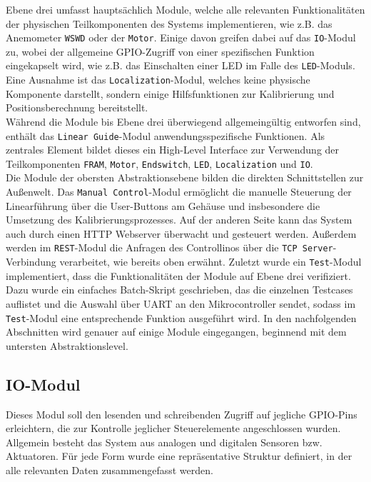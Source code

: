 \noindent
Ebene drei umfasst hauptsächlich Module, welche alle relevanten Funktionalitäten der physischen Teilkomponenten des Systems implementieren, wie z.B. das Anemometer \verb|WSWD| oder der \verb|Motor|. Einige davon greifen dabei auf das \verb|IO|-Modul zu, wobei der allgemeine GPIO-Zugriff von einer spezifischen Funktion eingekapselt wird, wie z.B. das Einschalten einer LED im Falle des \verb|LED|-Moduls. Eine Ausnahme ist das \verb|Localization|-Modul, welches keine physische Komponente darstellt, sondern einige Hilfsfunktionen zur Kalibrierung und Positionsberechnung bereitstellt.\\

\noindent
Während die Module bis Ebene drei überwiegend allgemeingültig entworfen sind, enthält das \verb|Linear Guide|-Modul anwendungsspezifische Funktionen. Als zentrales Element bildet dieses ein High-Level Interface zur Verwendung der Teilkomponenten \verb|FRAM|, \verb|Motor|, \verb|Endswitch|, \verb|LED|, \verb|Localization| und \verb|IO|. \\

\noindent
Die Module der obersten Abstraktionsebene bilden die direkten Schnittstellen zur Außenwelt. Das \verb|Manual Control|-Modul ermöglicht die manuelle Steuerung der Linearführung über die User-Buttons am Gehäuse und insbesondere die Umsetzung des Kalibrierungsprozesses. Auf der anderen Seite kann das System auch durch einen \ac{HTTP} Webserver überwacht und gesteuert werden. Außerdem werden im \verb|REST|-Modul die Anfragen des Controllinos über die \verb|TCP Server|-Verbindung verarbeitet, wie bereits oben erwähnt. Zuletzt wurde ein \verb|Test|-Modul implementiert, dass die Funktionalitäten der Module auf Ebene drei verifiziert. Dazu wurde ein einfaches Batch-Skript geschrieben, das die einzelnen Testcases auflistet und die Auswahl über UART an den  Mikrocontroller sendet, sodass im \verb|Test|-Modul eine entsprechende Funktion ausgeführt wird. In den nachfolgenden Abschnitten wird genauer auf einige Module eingegangen, beginnend mit dem untersten Abstraktionslevel.

\subsection{IO-Modul}
Dieses Modul soll den lesenden und schreibenden Zugriff auf jegliche GPIO-Pins erleichtern, die zur Kontrolle jeglicher Steuerelemente angeschlossen wurden. Allgemein besteht das System aus analogen und digitalen Sensoren bzw. Aktuatoren. Für jede Form wurde eine repräsentative Struktur definiert, in der alle relevanten Daten zusammengefasst werden.
